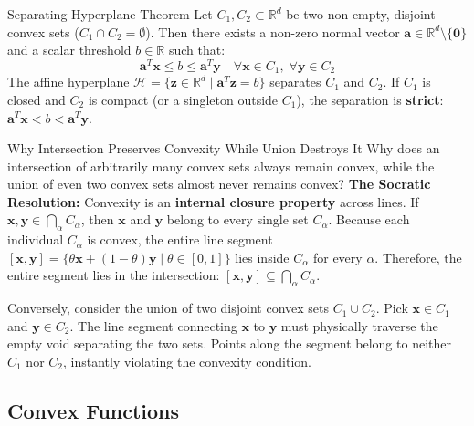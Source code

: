 \begin{theorembox}{Separating Hyperplane Theorem}
Let $C_1, C_2 \subset \mathbb{R}^d$ be two non-empty, disjoint convex sets ($C_1 \cap C_2 = \emptyset$). 
Then there exists a non-zero normal vector $\mathbf{a} \in \mathbb{R}^d \setminus \{\mathbf{0}\}$ and a scalar threshold $b \in \mathbb{R}$ such that:
\begin{equation}
\mathbf{a}^T \mathbf{x} \le b \le \mathbf{a}^T \mathbf{y} \quad \forall \mathbf{x} \in C_1, \; \forall \mathbf{y} \in C_2
\label{eq:separating_hyperplane}
\end{equation}
The affine hyperplane $\mathcal{H} = \{\mathbf{z} \in \mathbb{R}^d \mid \mathbf{a}^T \mathbf{z} = b\}$ separates $C_1$ and $C_2$. If $C_1$ is closed and $C_2$ is compact (or a singleton outside $C_1$), the separation is \textbf{strict}: $\mathbf{a}^T \mathbf{x} < b < \mathbf{a}^T \mathbf{y}$.
\end{theorembox}

\begin{ponderbox}{Why Intersection Preserves Convexity While Union Destroys It}
Why does an intersection of arbitrarily many convex sets always remain convex, while the union of even two convex sets almost never remains convex?
\tcblower
\textbf{The Socratic Resolution:} Convexity is an \textbf{internal closure property} across lines. 
If $\mathbf{x}, \mathbf{y} \in \bigcap_{\alpha} C_\alpha$, then $\mathbf{x}$ and $\mathbf{y}$ belong to every single set $C_\alpha$. Because each individual $C_\alpha$ is convex, the entire line segment $[\mathbf{x}, \mathbf{y}] = \{\theta \mathbf{x} + (1-\theta)\mathbf{y} \mid \theta \in [0, 1]\}$ lies inside $C_\alpha$ for every $\alpha$. Therefore, the entire segment lies in the intersection: $[\mathbf{x}, \mathbf{y}] \subseteq \bigcap_\alpha C_\alpha$.

Conversely, consider the union of two disjoint convex sets $C_1 \cup C_2$. Pick $\mathbf{x} \in C_1$ and $\mathbf{y} \in C_2$. The line segment connecting $\mathbf{x}$ to $\mathbf{y}$ must physically traverse the empty void separating the two sets. Points along the segment belong to neither $C_1$ nor $C_2$, instantly violating the convexity condition.
\end{ponderbox}

\subsection{Convex Functions}

